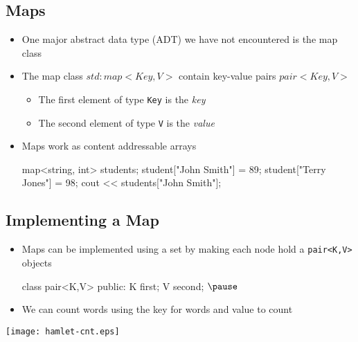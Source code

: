 \begin{slide}
\section[-2]{Maps}

\begin{PauseHighLight}
  \begin{itemize}
  \item One major abstract data type (ADT) we have not encountered is
    the map class\pause
  \item The map class \jl$std:map<Key,V>$ contain key-value pairs \jl$pair<Key,V>$\pause
    \begin{itemize}
    \item The first element of type \texttt{Key} is the \emph{key}\pause
    \item The second element of type \texttt{V} is the \emph{value}\pause
    \end{itemize}
  \item Maps work as content addressable arrays\pause
    \begin{java}
      map<string, int> students;
      student["John Smith"] = 89;
      student["Terry Jones"] = 98;
      cout << students["John Smith"];
    \end{java}\pause
  \end{itemize}
\end{PauseHighLight}

\end{slide}


\begin{slide}
\section[-2]{Implementing a Map}

\begin{PauseHighLight}
  \begin{itemize}
  \item Maps can be implemented using a set by making each node
    hold a \texttt{pair<K,V>} objects\pause
    \begin{java}
      class pair<K,V> 
      {
        public:
        K first;
        V second;
      }$\pause$
    \end{java}
  \item We can count words using the key for words and value to count
  \end{itemize}
  \begin{center}\color{TextColor}
    \texttt{[image: hamlet-cnt.eps]}\pause
  \end{center}
\end{PauseHighLight}

\end{slide}

